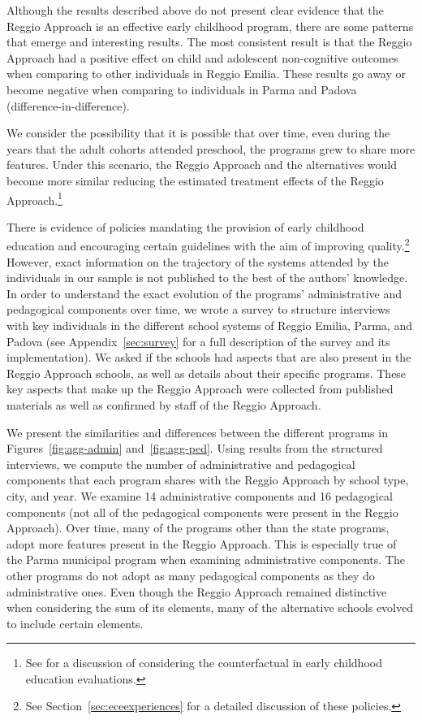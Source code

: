 Although the results described above do not present clear evidence that the Reggio Approach is an effective early childhood program, there are some patterns that emerge and interesting results. The most consistent result is that the Reggio Approach had a positive effect on child and adolescent non-cognitive outcomes when comparing to other individuals in Reggio Emilia. These results go away or become negative when comparing to individuals in Parma and Padova (difference-in-difference). 

We consider the possibility that it is possible that over time, even during the years that the adult cohorts attended preschool, the programs grew to share more features. Under this scenario, the Reggio Approach and the alternatives would become more similar reducing the estimated treatment effects of the Reggio Approach.\footnote{See \citet{Elango_Hojman_etal_2016_Early-Edu} for a discussion of considering the counterfactual in early childhood education evaluations.} 

There is evidence of policies mandating the provision of early childhood education and encouraging certain guidelines with the aim of improving quality.\footnote{See Section~\ref{sec:eceexperiences} for a detailed discussion of these policies.} However, exact information on the trajectory of the systems attended by the individuals in our sample is not published to the best of the authors' knowledge. In order to understand the exact evolution of the programs' administrative and pedagogical components over time, we wrote a survey to structure interviews with key individuals in the different school systems of Reggio Emilia, Parma, and Padova (see Appendix~\ref{sec:survey} for a full description of the survey and its implementation). We asked if the schools had aspects that are also present in the Reggio Approach schools, as well as details about their specific programs. These key aspects that make up the Reggio Approach were collected from published materials as well as confirmed by staff of the Reggio Approach. 

We present the similarities and differences between the different programs in Figures~\ref{fig:agg-admin} and~\ref{fig:agg-ped}. Using results from the structured interviews, we compute the number of administrative and pedagogical components that each program shares with the Reggio Approach by school type, city, and year. We examine 14 administrative components and 16 pedagogical components (not all of the pedagogical components were present in the Reggio Approach). Over time, many of the programs other than the state programs, adopt more features present in the Reggio Approach. This is especially true of the Parma municipal program when examining administrative components. The other programs do not adopt as many pedagogical components as they do administrative ones. Even though the Reggio Approach remained distinctive when considering the sum of its elements, many of the alternative schools evolved to include certain elements.

